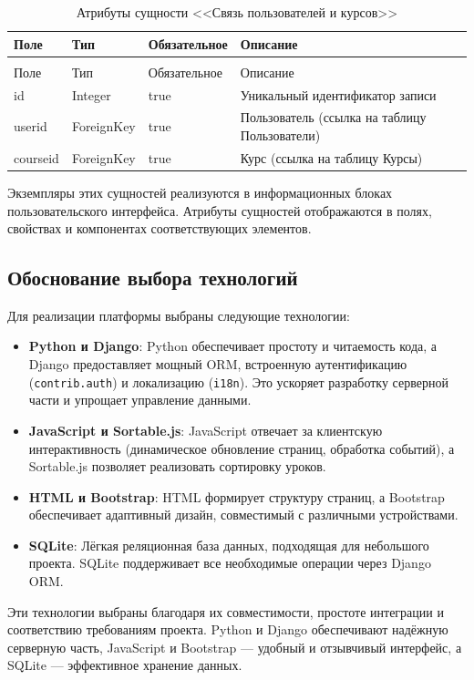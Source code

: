 \begin{xltabular}{\textwidth}{|l|l|p{3.2cm}|X|}
	\caption{Атрибуты сущности <<Связь пользователей и курсов>>\label{user_courses:table}}\\ \hline
	Поле & Тип & Обязательное & Описание \\ \hline
	\endfirsthead
	\\ \hline
	Поле & Тип & Обязательное & Описание \\ \hline
	\endhead
	id & Integer & true & Уникальный идентификатор записи \\ \hline
	userid & ForeignKey & true & Пользователь (ссылка на таблицу Пользователи) \\ \hline
	courseid & ForeignKey & true & Курс (ссылка на таблицу Курсы) \\ \hline
\end{xltabular}

Экземпляры этих сущностей реализуются в информационных блоках пользовательского интерфейса. Атрибуты сущностей отображаются в полях, свойствах и компонентах соответствующих элементов.

\subsection{Обоснование выбора технологий}

Для реализации платформы выбраны следующие технологии:
\begin{itemize}
	\item \textbf{Python и Django}: Python обеспечивает простоту и читаемость кода, а Django предоставляет мощный ORM, встроенную аутентификацию (\texttt{contrib.auth}) и локализацию (\texttt{i18n}). Это ускоряет разработку серверной части и упрощает управление данными.
	\item \textbf{JavaScript и Sortable.js}: JavaScript отвечает за клиентскую интерактивность (динамическое обновление страниц, обработка событий), а Sortable.js позволяет реализовать сортировку уроков.
	\item \textbf{HTML и Bootstrap}: HTML формирует структуру страниц, а Bootstrap обеспечивает адаптивный дизайн, совместимый с различными устройствами.
	\item \textbf{SQLite}: Лёгкая реляционная база данных, подходящая для небольшого проекта. SQLite поддерживает все необходимые операции через Django ORM.
\end{itemize}

Эти технологии выбраны благодаря их совместимости, простоте интеграции и соответствию требованиям проекта. Python и Django обеспечивают надёжную серверную часть, JavaScript и Bootstrap — удобный и отзывчивый интерфейс, а SQLite — эффективное хранение данных.




